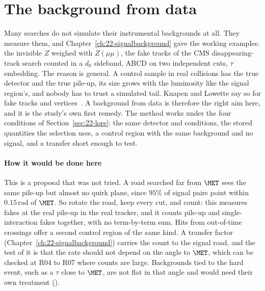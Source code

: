 \section{The background from data}\label{sec:28-data}

Many searches do not simulate their instrumental backgrounds at all. They measure them, and Chapter~\ref{ch:22-signalbackground} gave the working examples: the invisible $Z$ weighed with $Z(\mu\mu)$, the fake tracks of the CMS disappearing-track search counted in a $d_0$ sideband, ABCD on two independent cuts, $\tau$ embedding. The reason is general. A control sample in real collisions has the true detector and the true pile-up, its size grows with the luminosity like the signal region's, and nobody has to trust a simulated tail. Knapen and Lowette say so for fake tracks and vertices~\cite{Knapen:2022afb}. A background from data is therefore the right aim here, and it is the study's own first remedy. The method works under the four conditions of Section~\ref{sec:22-lore}: the same detector and conditions, the stored quantities the selection uses, a control region with the same background and no signal, and a transfer short enough to test.

\paragraph{How it would be done here}
This is a proposal that was not tried. A road searched far from $\MET$ sees the same pile-up but almost no quirk plane, since $95\%$ of signal pairs point within $0.15$\,rad of $\MET$. So rotate the road, keep every cut, and count: this measures fakes at the real pile-up in the real tracker, and it counts pile-up and single-interaction fakes together, with no term-by-term sum. Hits from out-of-time crossings offer a second control region of the same kind. A transfer factor (Chapter~\ref{ch:22-signalbackground}) carries the count to the signal road, and the test of it is that the rate should not depend on the angle to $\MET$, which can be checked at R04 to R07 where counts are large. Backgrounds tied to the hard event, such as a $\tau$ close to $\MET$, are not flat in that angle and would need their own treatment (\EST).


